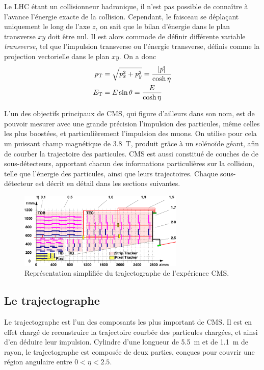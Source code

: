 Le LHC étant un collisionneur hadronique, il n'est pas possible de connaître à l'avance l'énergie exacte de la collision. Cependant, le faisceau se déplaçant uniquement le long de l'axe $z$, on sait que le bilan d'énergie dans le plan transverse $xy$ doit être nul. Il est alors commode de définir différente variable \emph{transverse}, tel que l'impulsion transverse ou l'énergie transverse, définis comme la projection vectorielle dans le plan $xy$. On a donc
\begin{align*}
  p_{\mathrm{T}} &= \sqrt{p_x^2 + p_y^2} = \frac{\lvert \vec{p} \rvert}{\cosh\eta} \\
  E_{\mathrm{T}} &= E \sin\theta = \frac{E}{\cosh\eta}
\end{align*}


L'un des objectifs principaux de CMS, qui figure d'ailleurs dans son nom, est de pouvoir mesurer avec une grande précision l'impulsion des particules, même celles les plus boostées, et particulièrement l'impulsion des muons. On utilise pour cela un puissant champ magnétique de \SI{3.8}{\tesla}, produit grâce à un solénoïde géant, afin de courber la trajectoire des particules. CMS est aussi constitué de couches de de sous-détecteurs, apportant chacun des informations particulières sur la collision, telle que l'énergie des particules, ainsi que leurs trajectoires. Chaque sous-détecteur est décrit en détail dans les sections suivantes.

\begin{figure}[t] \centering
  \includegraphics[width=0.7\textwidth]{chapitre2/figs/tracker.pdf}
  \caption{Représentation simplifiée du trajectographe de l'expérience CMS.}
  \label{fig:tracker}
\end{figure}

\subsection{Le trajectographe}

Le trajectographe est l'un des composants les plus important de CMS. Il est en effet chargé de reconstruire la trajectoire courbée des particules chargées, et ainsi d'en déduire leur impulsion. Cylindre d'une longueur de \SI{5.5}{\m} et de \SI{1.1}{\m} de rayon, le trajectographe est composée de deux parties, conçues pour couvrir une région angulaire entre $0 < \eta < \num{2.5}$.

